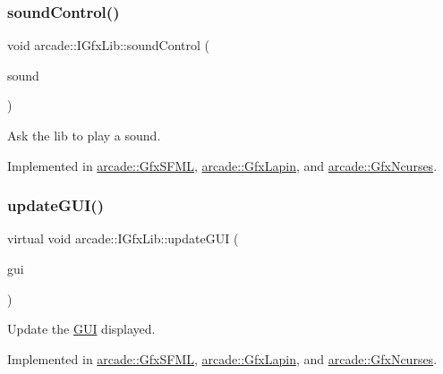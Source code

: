 \subsubsection{\texorpdfstring{sound\+Control()}{soundControl()}}
{\footnotesize\ttfamily void arcade\+::\+I\+Gfx\+Lib\+::sound\+Control (\begin{DoxyParamCaption}\item[{const \hyperlink{structarcade_1_1_sound}{Sound} \&}]{sound }\end{DoxyParamCaption})\hspace{0.3cm}{\ttfamily [pure virtual]}}



Ask the lib to play a sound. 



Implemented in \hyperlink{classarcade_1_1_gfx_s_f_m_l_a785424b9463d487365c781bf91eda6a8}{arcade\+::\+Gfx\+S\+F\+ML}, \hyperlink{classarcade_1_1_gfx_lapin_ad0f1a1014b88cf7f51ea85ab99e0c87b}{arcade\+::\+Gfx\+Lapin}, and \hyperlink{classarcade_1_1_gfx_ncurses_a5eabfc85f5ae13bf0592dd21add9f301}{arcade\+::\+Gfx\+Ncurses}.

\mbox{\label{classarcade_1_1_i_gfx_lib_ae3f443cc341512433815e8bf2dee3e0d}} 
\subsubsection{\texorpdfstring{update\+G\+U\+I()}{updateGUI()}}
{\footnotesize\ttfamily virtual void arcade\+::\+I\+Gfx\+Lib\+::update\+G\+UI (\begin{DoxyParamCaption}\item[{\hyperlink{classarcade_1_1_i_g_u_i}{I\+G\+UI} \&}]{gui }\end{DoxyParamCaption})\hspace{0.3cm}{\ttfamily [pure virtual]}}



Update the \hyperlink{classarcade_1_1_g_u_i}{G\+UI} displayed. 



Implemented in \hyperlink{classarcade_1_1_gfx_s_f_m_l_ad8ba0c70b00c4132010ceabc2246bb59}{arcade\+::\+Gfx\+S\+F\+ML}, \hyperlink{classarcade_1_1_gfx_lapin_a6b226d0278ba5d43e956eb28557124ef}{arcade\+::\+Gfx\+Lapin}, and \hyperlink{classarcade_1_1_gfx_ncurses_a00469b26c23ff57efdbb2f99dedbbb11}{arcade\+::\+Gfx\+Ncurses}.

